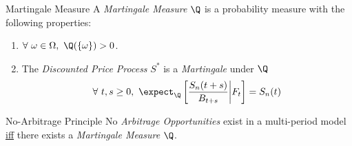 \documentclass[11pt,a4paper]{article}
\begin{document}
  \begin{definition}{Martingale Measure}\label{def_martingale_measure}
    A \textit{Martingale Measure} $\Q$ is a probability measure with the following properties:
    \begin{enumerate}
      \item $\forall\ \omega\in\Omega,\ \Q(\{\omega\})>0$.
      \item The \textit{Discounted Price Process} $S^*$ is a \textit{Martingale} under $\Q$
      \[ \forall\ t,s\geq0,\ \expect_\Q\left[\frac{S_n(t+s)}{B_{t+s}}\bigg|F_t\right]=S_n(t) \]
    \end{enumerate}
  \end{definition}

  \begin{theorem}{No-Arbitrage Principle}\label{the_no_arbitrage_principle_multi}
    No \textit{Arbitrage Opportunities} exist in a multi-period model \underline{iff} there exists a \textit{Martingale Measure} $\Q$.
  \end{theorem}
\end{document}
